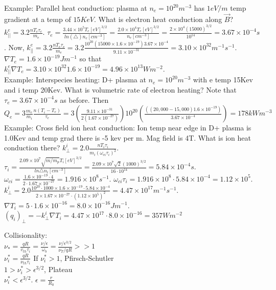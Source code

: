 \documentclass[10pt]{extarticle}
\begin{document}
\begin{multicols}{3}
Example: Parallel heat conduction: plasma at $n_{e} = 10^{20}m^{-3}$ has $1eV/m$ temp gradient at a temp of $15KeV$.  What is electron heat conduction along $\vec{B}$?  $k_{||}^{e} = 3.2\frac{nT_{e}\tau_{e}}{m_{e}}$.  $\tau_{e} = \frac{3.44 \times 10^{5}T_{e}[eV]^{3/2}}{ln(\triangle) n_{e}[cm^{-3}]} = \frac{2.0\times 10^{4} T_{e}[eV]^{3/2}}{n_{e}[cm^{-3}]} = \frac{2\times 10^{4} (15000)^{3/2}}{10^{14}} = 3.67\times 10^{-4} s$.  Now, $k_{||}^{e} = 3.2\frac{nT_{e}\tau_{e}}{m_{e}} = 3.2\frac{10^{20}(15000\times 1.6 \times 10^{-19}) 3.67 \times 10^{-4}}{9.11\times 10^{-31}} = 3.10\times 10^{32} m^{-1}s^{-1}$.  $\nabla T_{e} = 1.6\times 10^{-19} J m^{-1}$ so that $k_{||}^{e}\nabla T_{e} = 3.10 \times 10^{32} 1.6 \times 10^{-19} = 4.96 \times 10^{13} W m^{-2}$.\\
Example: Interspecies heating: D+ plasma at $n_{e} = 10^{20} m^{-3}$ with e temp 15Kev and i temp 20Kev.  What is volumetric rate of electron heating?  Note that $\tau_{e} = 3.67\times 10^{-4}s$ as before.  Then $Q_{e} = 3\frac{m_{e}}{m_{i}}\frac{n(T_{i} - T_{e})}{\tau_{e}} = 3 (\frac{9.11 \times 10^{-31}}{2 (1.67 \times 10^{-27})})10^{20}(\frac{((20,000 - 15,000)1.6\times 10^{-19})}{3.67\times 10^{-4}}) = 178kW m^{-3}$\\
Example: Cross field ion heat conduction: Ion temp near edge in D+ plasma is 1.0Kev and temp grad there is -5 kev per m. Mag field is 4T.  What is ion heat conduction there?  $k_{\perp}^{i} = 2.0 \frac{nT_{i}\tau_{i}}{m_{i}(\omega_{ci}\tau_{i})^{2}}$.  $\tau_{i} = \frac{2.09\times 10^{7} \sqrt{m/m_{p}} T_{i}[eV]^{3/2} }{ln\triangle n_{i}[cm^{-3}]} = \frac{2.09\times 10^{7} \sqrt{2} (1000)^{3/2}}{16 \cdot 10^{14}} = 5.84\times 10^{-4} s$.  $\omega_{ci} = \frac{1.6\times 10^{-19} \cdot 4}{2 \cdot 1.67 \times 10^{-27}} = 1.916 \times 10^{8} s^{-1}$.  $\omega_{ci}\tau_{i} = 1.916\times 10^{8} \cdot 5.84 \times 10^{-4} = 1.12 \times 10^{5}$.  $k_{\perp}^{i} = 2.0\frac{10^{20}\cdot 1000 \times 1.6 \times 10^{-19} \cdot 5.84 \times 10^{-4}}{2 \times 1.67 \times 10^{-27} \cdot (1.12 \times 10^{5})^{2}} = 4.47\times 10^{17} m^{-1}s^{-1}$.  $\nabla T_{i} = 5 \cdot 1.6\times 10^{-16} = 8.0 \times 10^{-16} J m^{-1}$.  $(q_{i})_{\perp} = -k_{\perp}^{i} \nabla T_{i} = 4.47 \times 10^{17} \cdot 8.0 \times 10^{-16} = 357 W m^{-2}$

 
 Collisionality:\\
 $\nu_{*} = \frac{qR}{v_{th}\tau_{i}} = \frac{\nu / \epsilon}{\omega_{b}} = \frac{\nu / \epsilon^{3/2}}{\nu_{T}/ qR} >> 1$\\
 $\nu_{i}^{*} = \frac{qR}{\nu_{th}\tau_{i}}$
 If $\nu_{i}^{*} > 1$, Pfirsch-Schutler\\
 $1 > \nu_{i}^{*} > \epsilon^{3/2}$, Plateau\\
 $\nu_{i}^{*} < \epsilon^{3/2}$.
 $\epsilon = \frac{r}{R_{0}}$\\ 
 

\end{multicols}
\end{document}
